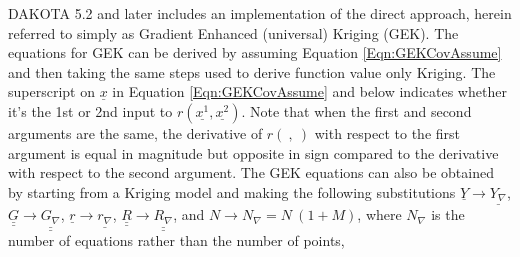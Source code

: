 DAKOTA 5.2 and later includes an implementation of the direct approach,
herein referred to simply as Gradient Enhanced (universal) Kriging (GEK).  
The equations for GEK can be derived by assuming Equation 
\ref{Eqn:GEKCovAssume} and then taking the same steps used to derive 
function value only Kriging.  The superscript on $\underline{x}$ 
in Equation \ref{Eqn:GEKCovAssume} and below indicates whether it's 
the 1st or 2nd input to $r\left(\underline{x^1},\underline{x^2}\right)$.  
Note that when the first and second arguments are the same, the derivative 
of $r\left(\ ,\ \right)$ with respect to the first argument is equal in 
magnitude but opposite in sign compared to the derivative with respect to 
the second argument.  The GEK equations can also be obtained by starting 
from a Kriging model and making the following substitutions
$\underline{Y}\rightarrow\underline{Y_{\nabla}}$, 
$\underline{\underline{G}}\rightarrow\underline{\underline{G_{\nabla}}}$,
$\underline{r}\rightarrow\underline{r_{\nabla}}$,
$\underline{\underline{R}}\rightarrow\underline{\underline{R_{\nabla}}}$,
and $N\rightarrow N_{\nabla}=N\ (1+M)$, where $N_{\nabla}$ is the number 
of equations rather than the number of points,
